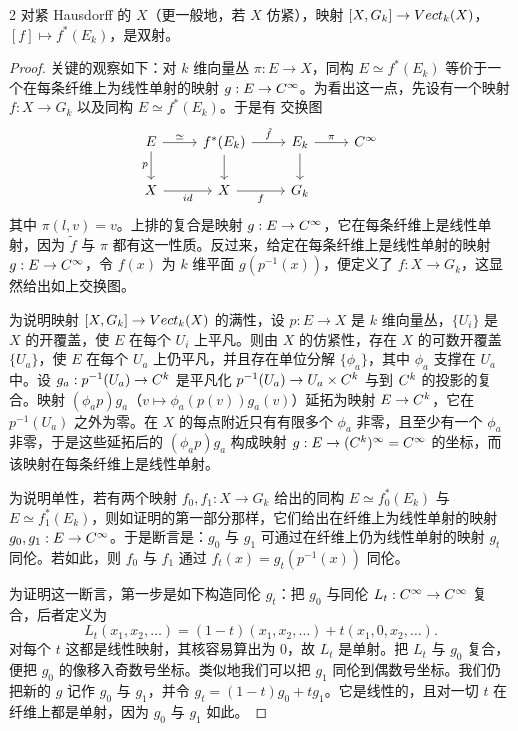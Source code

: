 \begin{thm}{2}
对紧 Hausdorff 的 $X$（更一般地，若 $X$ 仿紧），映射 $[X,G_k]\to Vect_k(X)$，$[f]\mapsto f^*(E_k)$，是双射。
\end{thm}

\begin{proof}
关键的观察如下：对 $k$ 维向量丛 $\pi: E\to X$，同构 $E\simeq f^*(E_k)$ 等价于一个在每条纤维上为线性单射的映射 $g: E\to C^\infty$。为看出这一点，先设有一个映射 $f: X\to G_k$ 以及同构 $E\simeq f^*(E_k)$。于是有
交换图
\[
\begin{tikzcd}
E \arrow[r,"\simeq"] \arrow[d,"p"'] & f^*(E_k) \arrow[r,"\tilde f"] \arrow[d] & E_k \arrow[r,"\pi"] \arrow[d] & \C^\infty \\
X \arrow[r,"id"'] & X \arrow[r,"f"'] & G_k &
\end{tikzcd}
\]
其中 $\pi(l,v)=v$。上排的复合是映射 $g: E\to C^\infty$，它在每条纤维上是线性单射，因为 $\tilde f$ 与 $\pi$ 都有这一性质。反过来，给定在每条纤维上是线性单射的映射 $g: E\to C^\infty$，令 $f(x)$ 为 $k$ 维平面 $g(p^{-1}(x))$，便定义了 $f: X\to G_k$，这显然给出如上交换图。

为说明映射 $[X,G_k]\to Vect_k(X)$ 的满性，设 $p: E\to X$ 是 $k$ 维向量丛，$\{U_i\}$ 是 $X$ 的开覆盖，使 $E$ 在每个 $U_i$ 上平凡。则由 $X$ 的仿紧性，存在 $X$ 的可数开覆盖 $\{U_a\}$，使 $E$ 在每个 $U_a$ 上仍平凡，并且存在单位分解 $\{\phi_a\}$，其中 $\phi_a$ 支撑在 $U_a$ 中。设 $g_a: p^{-1}(U_a)\to C^k$ 是平凡化 $p^{-1}(U_a)\to U_a\times C^k$ 与到 $C^k$ 的投影的复合。映射 $(\phi_a p)g_a$（$v\mapsto\phi_a(p(v))g_a(v)$）延拓为映射 $E\to C^k$，它在 $p^{-1}(U_a)$ 之外为零。在 $X$ 的每点附近只有有限多个 $\phi_a$ 非零，且至少有一个 $\phi_a$ 非零，于是这些延拓后的 $(\phi_a p)g_a$ 构成映射 $g: E\to(C^k)^\infty=C^\infty$ 的坐标，而该映射在每条纤维上是线性单射。

为说明单性，若有两个映射 $f_0,f_1: X\to G_k$ 给出的同构 $E\simeq f_0^*(E_k)$ 与 $E\simeq f_1^*(E_k)$，则如证明的第一部分那样，它们给出在纤维上为线性单射的映射 $g_0,g_1: E\to C^\infty$。于是断言是：$g_0$ 与 $g_1$ 可通过在纤维上仍为线性单射的映射 $g_t$ 同伦。若如此，则 $f_0$ 与 $f_1$ 通过 $f_t(x)=g_t(p^{-1}(x))$ 同伦。

为证明这一断言，第一步是如下构造同伦 $g_t$：把 $g_0$ 与同伦 $L_t: C^\infty\to C^\infty$ 复合，后者定义为
\[ L_t(x_1,x_2,\dots)=(1-t)(x_1,x_2,\dots)+t(x_1,0,x_2,\dots). \]
对每个 $t$ 这都是线性映射，其核容易算出为 $0$，故 $L_t$ 是单射。把 $L_t$ 与 $g_0$ 复合，便把 $g_0$ 的像移入奇数号坐标。类似地我们可以把 $g_1$ 同伦到偶数号坐标。我们仍把新的 $g$ 记作 $g_0$ 与 $g_1$，并令 $g_t=(1-t)g_0+tg_1$。它是线性的，且对一切 $t$ 在纤维上都是单射，因为 $g_0$ 与 $g_1$ 如此。
\end{proof}

